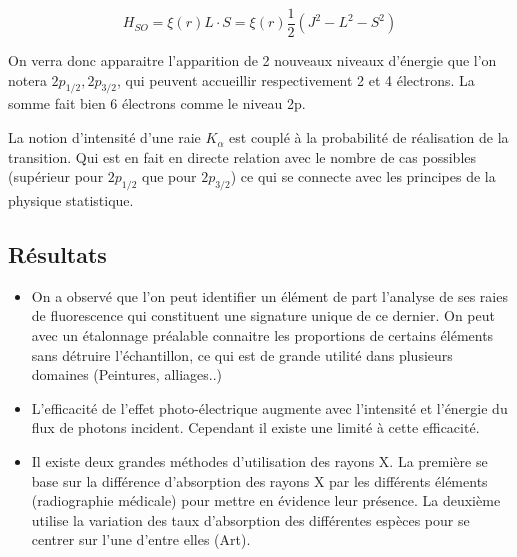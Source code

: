 \[
	H_{SO}=\xi(r) L\cdot S = \xi(r)\frac{1}{2}(J^2-L^2-S^2)
\]

On verra donc apparaitre l'apparition de 2 nouveaux niveaux d'énergie que l'on notera $2p_{1/2},2p_{3/2}$, qui peuvent accueillir respectivement 2 et 4 électrons. La somme fait bien 6 électrons comme le niveau 2p.

La notion d'intensité d'une raie $K_\alpha$ est couplé à la probabilité de réalisation de la transition. Qui est en fait en directe relation avec le nombre de cas possibles (supérieur pour $2p_{1/2}$ que pour  $2p_{3/2}$) ce qui se connecte avec les principes de la physique statistique.


\subsection{Résultats}


\begin{itemize}[label=]

	\item On a observé que l'on peut identifier un élément de part l'analyse de ses raies de fluorescence qui constituent une signature unique de ce dernier. On peut avec un étalonnage préalable connaitre les proportions de certains éléments sans détruire l'échantillon, ce qui est de grande utilité dans plusieurs domaines (Peintures, alliages..)

	\item L'efficacité de l'effet photo-électrique augmente avec l'intensité et l'énergie du flux de photons incident. Cependant il existe une limité à cette efficacité. 

	\item Il existe deux grandes méthodes d'utilisation des rayons X. La première se base sur la différence d'absorption des rayons X par les différents éléments (radiographie médicale) pour mettre en évidence leur présence. La deuxième utilise la variation des taux d'absorption des différentes espèces pour se centrer sur l'une d'entre elles (Art).

\end{itemize}